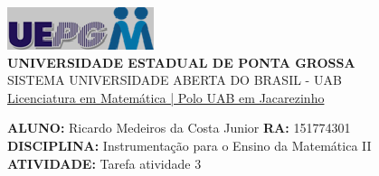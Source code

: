 \documentclass[a4paper, 12pt]{article}
\begin{document}
\begin{flushleft}\includegraphics{logo}\\
\textbf{UNIVERSIDADE ESTADUAL DE PONTA GROSSA} \\
SISTEMA UNIVERSIDADE ABERTA DO BRASIL - UAB \\
\underline{Licenciatura em Matemática | Polo UAB em Jacarezinho}\end{flushleft} 
\textbf{ALUNO:} Ricardo Medeiros da Costa Junior   \textbf{RA:} 151774301 \\
\textbf{DISCIPLINA:} Instrumentação para o Ensino da Matemática II \\
\textbf{ATIVIDADE:} Tarefa atividade 3  \\
\end{document}
